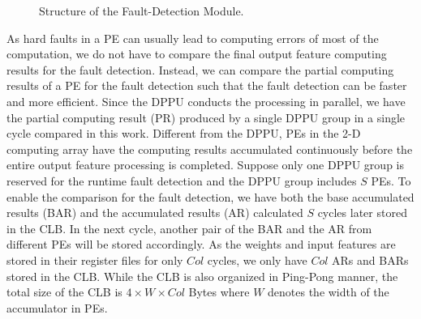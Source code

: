 \begin{figure}[tb]
    \setlength{\abovecaptionskip}{-1pt}
    \setlength{\belowcaptionskip}{-10pt}
            \caption{Structure of the Fault-Detection Module.}
            \label{fig:detection}
            \vspace{-1.5em}
\end{figure}

As hard faults in a PE can usually lead to computing errors of most of the computation, we do not have to compare the final output feature computing results for the fault detection. Instead, we can compare the partial computing results of a PE for the fault detection such that the fault detection can be faster and more efficient. Since the DPPU conducts the processing in parallel, we have the partial computing result (PR) produced by a single DPPU group in a single cycle compared in this work. Different from the DPPU, PEs in the 2-D computing array have the computing results accumulated continuously before the entire output feature processing is completed. Suppose only one DPPU group is reserved for the runtime fault detection and the DPPU group includes $S$ PEs. To enable the comparison for the fault detection, we have both the base accumulated results (BAR) and the accumulated results (AR) calculated $S$ cycles later stored in the CLB. In the next cycle, another pair of the BAR and the AR from different PEs will be stored accordingly. As the weights and input features are stored in their register files for only $Col$ cycles, we only have $Col$ ARs and BARs stored in the CLB. While the CLB is also organized in Ping-Pong manner, the total size of the CLB is $4 \times W \times Col$ Bytes where $W$ denotes the width of the accumulator in PEs. 

